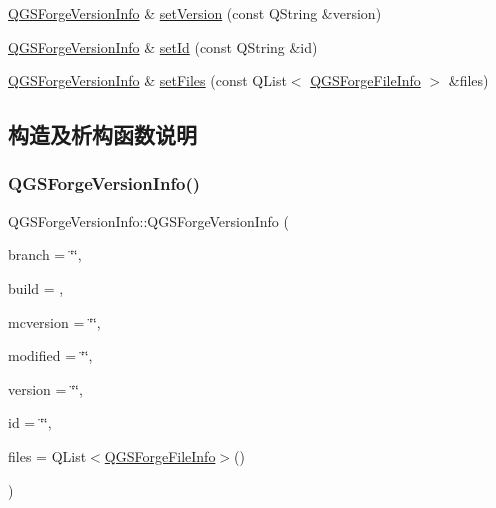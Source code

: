 \begin{DoxyCompactItemize}
\item 
\mbox{\hyperlink{class_q_g_s_forge_version_info}{Q\+G\+S\+Forge\+Version\+Info}} \& \mbox{\hyperlink{class_q_g_s_forge_version_info_a393fec44f191cdc7ed22adc3f00dad63}{set\+Version}} (const Q\+String \&version)
\item 
\mbox{\hyperlink{class_q_g_s_forge_version_info}{Q\+G\+S\+Forge\+Version\+Info}} \& \mbox{\hyperlink{class_q_g_s_forge_version_info_a4bade0ca7ec3c8d8ceac5c9f90e02ec7}{set\+Id}} (const Q\+String \&id)
\item 
\mbox{\hyperlink{class_q_g_s_forge_version_info}{Q\+G\+S\+Forge\+Version\+Info}} \& \mbox{\hyperlink{class_q_g_s_forge_version_info_a2f85acf3de56bd8bf68c6809adf4dc66}{set\+Files}} (const Q\+List$<$ \mbox{\hyperlink{class_q_g_s_forge_version_info_1_1_q_g_s_forge_file_info}{Q\+G\+S\+Forge\+File\+Info}} $>$ \&files)
\end{DoxyCompactItemize}


\subsection{构造及析构函数说明}
\mbox{\label{class_q_g_s_forge_version_info_af53165123913497faf3768e70155d33b}} 
\subsubsection{\texorpdfstring{Q\+G\+S\+Forge\+Version\+Info()}{QGSForgeVersionInfo()}\hspace{0.1cm}{\footnotesize\ttfamily [1/3]}}
{\footnotesize\ttfamily Q\+G\+S\+Forge\+Version\+Info\+::\+Q\+G\+S\+Forge\+Version\+Info (\begin{DoxyParamCaption}\item[{const Q\+String \&}]{branch = {\ttfamily \char`\"{}\char`\"{}},  }\item[{const int}]{build = {},  }\item[{const Q\+String \&}]{mcversion = {\ttfamily \char`\"{}\char`\"{}},  }\item[{const Q\+String \&}]{modified = {\ttfamily \char`\"{}\char`\"{}},  }\item[{const Q\+String \&}]{version = {\ttfamily \char`\"{}\char`\"{}},  }\item[{const Q\+String \&}]{id = {\ttfamily \char`\"{}\char`\"{}},  }\item[{const Q\+List$<$ \mbox{\hyperlink{class_q_g_s_forge_version_info_1_1_q_g_s_forge_file_info}{Q\+G\+S\+Forge\+File\+Info}} $>$ \&}]{files = {\ttfamily QList$<$\mbox{\hyperlink{class_q_g_s_forge_version_info_1_1_q_g_s_forge_file_info}{Q\+G\+S\+Forge\+File\+Info}}$>$()} }\end{DoxyParamCaption})}


